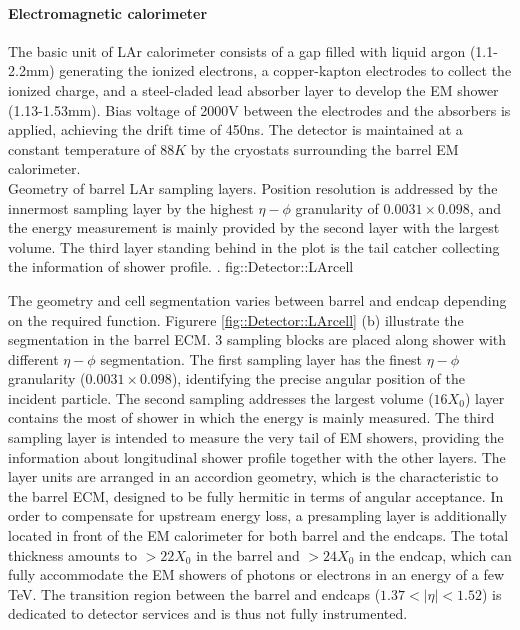 \paragraph{Electromagnetic calorimeter}
%
The basic unit of LAr calorimeter consists of a gap filled with liquid argon (1.1-2.2mm) generating the ionized electrons, a copper-kapton electrodes to collect the ionized charge, 
and a steel-claded lead absorber layer to develop the EM shower (1.13-1.53mm). Bias voltage of 2000V between the electrodes and the absorbers is applied, achieving the drift time of 450ns. The detector is maintained at a constant temperature of $88K$ by the cryostats surrounding the barrel EM calorimeter. \\

{Geometry of barrel LAr sampling layers. 
Position resolution is addressed by the innermost sampling layer by the highest $\eta-\phi$ granularity of $0.0031\times0.098$,
and the energy measurement is mainly provided by the second layer with the largest volume.
The third layer standing behind in the plot is the tail catcher collecting the information of shower profile.
    \cite{ATLAS_TDR}.}
{fig::Detector::LArcell}

The geometry and cell segmentation varies between barrel and endcap depending on the required function.
Figurere \ref{fig::Detector::LArcell} (b) illustrate the segmentation in the barrel ECM. 3 sampling blocks are placed along shower with different $\eta-\phi$ segmentation.
The first sampling layer has the finest $\eta-\phi$ granularity ($0.0031\times0.098$), identifying the precise angular position of the incident particle. The second sampling addresses the largest volume ($16X_0$) layer contains the most of shower in which the energy is mainly measured. The third sampling layer is intended to measure the very tail of EM showers, providing the information about longitudinal shower profile together with the other layers. The layer units are arranged in an accordion geometry, which is the characteristic to the barrel ECM, designed to be fully hermitic in terms of angular acceptance. 
In order to compensate for upstream energy loss, a presampling layer is additionally located in front of the EM calorimeter for both barrel and the endcaps.
The total thickness amounts to $>22X_0$ in the barrel and  $>24X_0$ in the endcap, which can fully accommodate the EM showers of photons or electrons in an energy of a few TeV.
The transition region between the barrel and endcaps ($1.37 < |\eta| <1.52$) is dedicated to detector services and is thus not fully instrumented.

